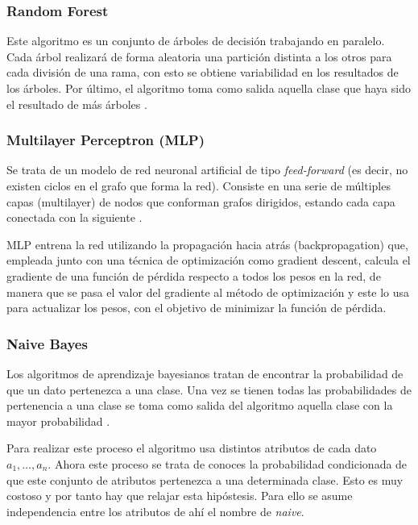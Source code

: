 \subsubsection{Random Forest}

Este algoritmo es un conjunto de árboles de decisión trabajando en paralelo. Cada árbol realizará de forma aleatoria una partición distinta a los otros para cada división de una rama, con esto se obtiene variabilidad en los resultados de los árboles. Por último, el algoritmo toma como salida aquella clase que haya sido el resultado de más árboles \cite{breiman2001random}\cite{hatwell2020chirps}.

\subsubsection{Multilayer Perceptron (MLP)}

Se trata de un modelo de red neuronal artificial de tipo \textit{feed-forward} (es decir, no existen ciclos en el grafo que forma la red). Consiste en una serie de múltiples capas (multilayer) de nodos que conforman grafos dirigidos, estando cada capa conectada con la siguiente \cite{murtagh1991multilayer}. 

MLP entrena la red utilizando la propagación hacia atrás (backpropagation) que, empleada junto con una técnica de optimización como gradient descent, calcula el gradiente de una función de pérdida respecto a todos los pesos en la red, de manera que se pasa el valor del gradiente al método de optimización y este lo usa para actualizar los pesos, con el objetivo de minimizar la función de pérdida.

\subsubsection{Naive Bayes}

Los algoritmos de aprendizaje bayesianos tratan de encontrar la probabilidad de que un dato pertenezca a una clase. Una vez se tienen todas las probabilidades de pertenencia a una clase se toma como salida del algoritmo aquella clase con la mayor probabilidad \cite{murphy2006naive}.

Para realizar este proceso el algoritmo usa distintos atributos de cada dato $a_1, \dots, a_n$. Ahora este proceso se trata de conoces la probabilidad condicionada de que este conjunto de atributos pertenezca a una determinada clase. Esto es muy costoso y por tanto hay que relajar esta hipóstesis. Para ello se asume independencia entre los atributos de ahí el nombre de \textit{naive}.

